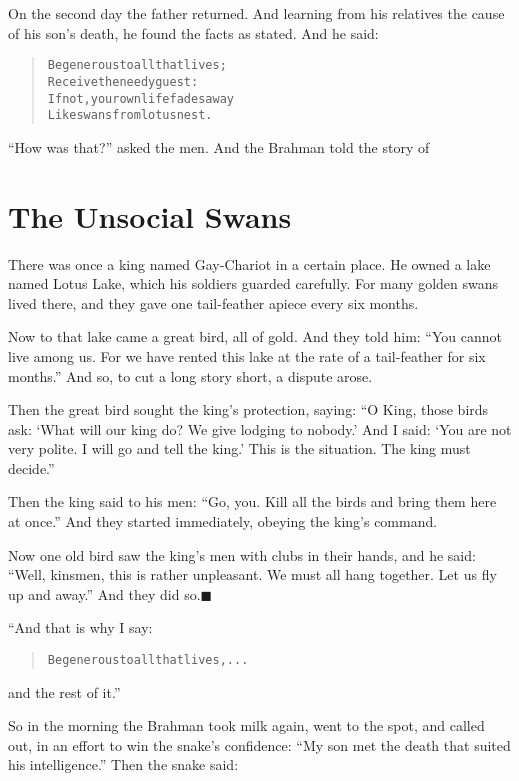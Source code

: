 \documentclass[article, twoside, 14pt]{memoir}
\newcommand{\qed}{\hfill \ensuremath{\blacksquare}}
\renewenvironment{verbatim}{%
\begin{quote}%
\vskip -10pt%
\begin{alltt}\normalfont\large}{\end{alltt}%
\end{quote}%
\vskip -10pt
} %
\begin{document}
On the second day the father returned. And learning from his
relatives the cause of his son's death, he found the facts as
stated. And he said:

\begin{verbatim}
Be generous to all that lives;
    Receive the needy guest:
If not, your own life fades away
    Like swans from lotus nest.
\end{verbatim}
``How was that?'' asked the men. And the Brahman told the story of

\chapter{The Unsocial Swans}

\label{s54}

There was once a king named Gay-Chariot in a certain place. He
owned a lake named Lotus Lake, which his soldiers guarded
carefully. For many golden swans lived there, and they gave one
tail-feather apiece every six months.

Now to that lake came a great bird, all of gold. And they told him:
``You cannot live among us. For we have rented this lake at the rate of a tail-feather for six months.''
And so, to cut a long story short, a dispute arose.

Then the great bird sought the king's protection, saying:
``O King, those birds ask: `What will our king do? We give lodging to nobody.' And I said: `You are not very polite. I will go and tell the king.' This is the situation. The king must decide.''

Then the king said to his men:
``Go, you. Kill all the birds and bring them here at once.'' And
they started immediately, obeying the king's command.

Now one old bird saw the king's men with clubs in their hands, and
he said:
``Well, kinsmen, this is rather unpleasant. We must all hang together. Let us fly up and away.''
And they did so.\hyperref[s54]{\qed}

“And that is why I say:

\begin{verbatim}
Be generous to all that lives, . . .
\end{verbatim}
and the rest of it.”

So in the morning the Brahman took milk again, went to the spot,
and called out, in an effort to win the snake's confidence:
``My son met the death that suited his intelligence.'' Then the
snake said:
\end{document}
